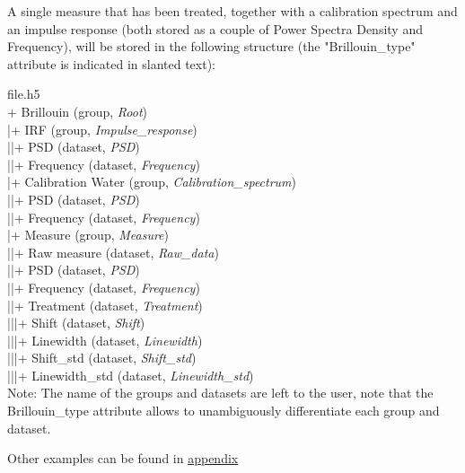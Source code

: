 A single measure that has been treated, together with a calibration spectrum and an impulse response (both stored as a couple of Power Spectra Density and Frequency), will be stored in the following structure (the "Brillouin\_type" attribute is indicated in slanted text):

\noindent file.h5\\
+ Brillouin (group, \textit{Root})\\
|\indent + IRF (group, \textit{Impulse\_response})\\
|\indent |\indent + PSD (dataset, \textit{PSD})\\
|\indent |\indent + Frequency (dataset, \textit{Frequency})\\
|\indent + Calibration Water (group, \textit{Calibration\_spectrum})\\
|\indent |\indent + PSD (dataset, \textit{PSD})\\
|\indent |\indent + Frequency (dataset, \textit{Frequency})\\
|\indent + Measure (group, \textit{Measure})\\
|\indent |\indent + Raw measure (dataset, \textit{Raw\_data})\\
|\indent |\indent + PSD (dataset, \textit{PSD})\\
|\indent |\indent + Frequency (dataset, \textit{Frequency})\\
|\indent |\indent + Treatment (dataset, \textit{Treatment})\\
|\indent |\indent |\indent + Shift (dataset, \textit{Shift})\\
|\indent |\indent |\indent + Linewidth (dataset, \textit{Linewidth})\\
|\indent |\indent |\indent + Shift\_std (dataset, \textit{Shift\_std})\\
|\indent |\indent |\indent + Linewidth\_std (dataset, \textit{Linewidth\_std})\\


Note: The name of the groups and datasets are left to the user, note that the Brillouin\_type attribute allows to unambiguously differentiate each group and dataset.

Other examples can be found in \hyperref[chap:examples_file_structures]{appendix}